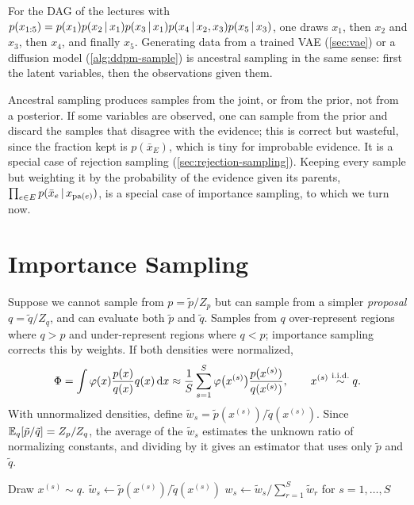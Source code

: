 For the DAG of the lectures with $p(x_{1:5})=p(x_1)p(x_2\,|\, x_1)p(x_3\,|\, x_1)p(x_4\,|\, x_2,x_3)p(x_5\,|\, x_3)$, one draws $x_1$, then $x_2$ and $x_3$, then $x_4$, and finally $x_5$. Generating data from a trained VAE (\cref{sec:vae}) or a diffusion model (\cref{alg:ddpm-sample}) is ancestral sampling in the same sense: first the latent variables, then the observations given them.

Ancestral sampling produces samples from the joint, or from the prior, not from a posterior. If some variables are observed, one can sample from the prior and discard the samples that disagree with the evidence; this is correct but wasteful, since the fraction kept is $p(\bar x_E)$, which is tiny for improbable evidence. It is a special case of rejection sampling (\cref{sec:rejection-sampling}). Keeping every sample but weighting it by the probability of the evidence given its parents, $\prod_{e\in E}p(\bar x_e\,|\, x_{\mathrm{pa}(e)})$, is a special case of importance sampling, to which we turn now.

\section{Importance Sampling}\label{sec:importance-sampling}

Suppose we cannot sample from $p=\tilde p/Z_p$ but can sample from a simpler \emph{proposal} $q=\tilde q/Z_q$, and can evaluate both $\tilde p$ and $\tilde q$. Samples from $q$ over-represent regions where $q>p$ and under-represent regions where $q<p$; importance sampling corrects this by weights. If both densities were normalized,
\[
\Phi=\int\varphi(x)\frac{p(x)}{q(x)}q(x)\,\mathrm{d} x\approx\frac1S\sum_{s=1}^S\varphi\big(x^{(s)}\big)\frac{p(x^{(s)})}{q(x^{(s)})},\qquad x^{(s)}\stackrel{\mathrm{i.i.d.}}{\sim} q.
\]
With unnormalized densities, define $\tilde w_s=\tilde p(x^{(s)})/\tilde q(x^{(s)})$. Since $\mathbb{E}_q[\tilde p/\tilde q]=Z_p/Z_q$, the average of the $\tilde w_s$ estimates the unknown ratio of normalizing constants, and dividing by it gives an estimator that uses only $\tilde p$ and $\tilde q$.

\begin{algorithm}[H]
\caption{Importance Sampling (Self-Normalized)}\label{alg:importance-sampling}
\begin{algorithmic}[1]
  \State Draw $x^{(s)}\sim q$.
  \State $\tilde w_s\gets\tilde p(x^{(s)})\big/\tilde q(x^{(s)})$ 
\EndFor
\State $w_s\gets\tilde w_s\big/\sum_{r=1}^S\tilde w_r$ for $s=1,\dots,S$ 
\end{algorithmic}
\end{algorithm}

